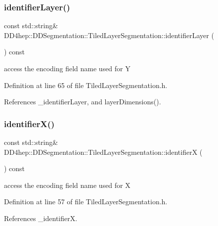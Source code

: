\subsubsection{\texorpdfstring{identifier\+Layer()}{identifierLayer()}}
{\footnotesize\ttfamily const std\+::string\& D\+D4hep\+::\+D\+D\+Segmentation\+::\+Tiled\+Layer\+Segmentation\+::identifier\+Layer (\begin{DoxyParamCaption}{ }\end{DoxyParamCaption}) const\hspace{0.3cm}{\ttfamily [inline]}}



access the encoding field name used for Y 



Definition at line 65 of file Tiled\+Layer\+Segmentation.\+h.



References \+\_\+identifier\+Layer, and layer\+Dimensions().

\hypertarget{class_d_d4hep_1_1_d_d_segmentation_1_1_tiled_layer_segmentation_aa9741a6cd5fa2e89e992315f65529fd9}{}\label{class_d_d4hep_1_1_d_d_segmentation_1_1_tiled_layer_segmentation_aa9741a6cd5fa2e89e992315f65529fd9} 
\subsubsection{\texorpdfstring{identifier\+X()}{identifierX()}}
{\footnotesize\ttfamily const std\+::string\& D\+D4hep\+::\+D\+D\+Segmentation\+::\+Tiled\+Layer\+Segmentation\+::identifierX (\begin{DoxyParamCaption}{ }\end{DoxyParamCaption}) const\hspace{0.3cm}{\ttfamily [inline]}}



access the encoding field name used for X 



Definition at line 57 of file Tiled\+Layer\+Segmentation.\+h.



References \+\_\+identifierX.

\hypertarget{class_d_d4hep_1_1_d_d_segmentation_1_1_tiled_layer_segmentation_a005f04e6ac9dd696ff6cf0b6096114bd}{}\label{class_d_d4hep_1_1_d_d_segmentation_1_1_tiled_layer_segmentation_a005f04e6ac9dd696ff6cf0b6096114bd} 
